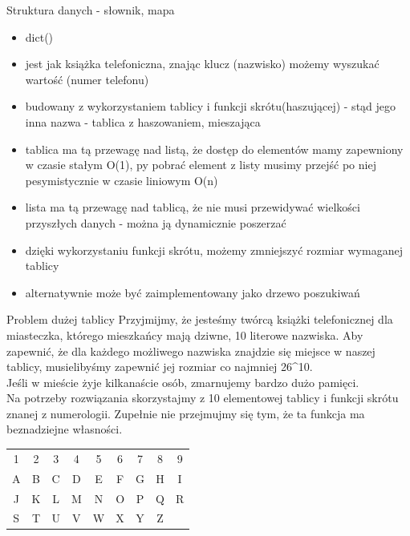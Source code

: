 \begin{frame}{Struktura danych - słownik, mapa}
    \begin{itemize}
        \item dict() \\
        \item jest jak książka telefoniczna, znając klucz (nazwisko) możemy wyszukać wartość (numer telefonu) \\
        \item budowany z wykorzystaniem tablicy i funkcji skrótu(haszującej) - stąd jego inna nazwa - tablica
        z haszowaniem, mieszająca \\
        \item tablica ma tą przewagę nad listą, że dostęp do elementów mamy zapewniony w czasie stałym O(1),
        py pobrać element z listy musimy przejść po niej pesymistycznie w czasie liniowym O(n) \\
        \item lista ma tą przewagę nad tablicą, że nie musi przewidywać wielkości przyszłych danych - można
        ją dynamicznie poszerzać \\
        \item dzięki wykorzystaniu funkcji skrótu, możemy zmniejszyć rozmiar wymaganej tablicy \\
        \item alternatywnie może być zaimplementowany jako drzewo poszukiwań
    \end{itemize}
\end{frame}
\begin{frame}{Problem dużej tablicy}
    Przyjmijmy, że jesteśmy twórcą książki telefonicznej dla miasteczka, którego mieszkańcy mają
    dziwne, 10 literowe nazwiska. Aby zapewnić, że dla każdego możliwego nazwiska znajdzie się
    miejsce w naszej tablicy, musielibyśmy zapewnić jej rozmiar co najmniej 26^{10}. \\
    Jeśli w mieście żyje kilkanaście osób, zmarnujemy bardzo dużo pamięci. \\
    Na potrzeby rozwiązania skorzystajmy z 10 elementowej tablicy i funkcji skrótu znanej z numerologii.
    Zupełnie nie przejmujmy się tym, że ta funkcja ma beznadziejne własności.
    \begin{table}
        \centering
        \begin{tabular}{|c|c|c|c|c|c|c|c|c|}
            \cline{1-9}
            1 & 2 & 3 & 4 & 5 & 6 & 7 & 8 & 9 \\
            \cline{1-9}
            A & B & C & D & E & F & G & H & I \\
            J & K & L & M & N & O & P & Q & R \\
            S & T & U & V & W & X & Y & Z & \\
            \cline{1-9}
        \end{tabular}
    \end{table}
\end{frame}
